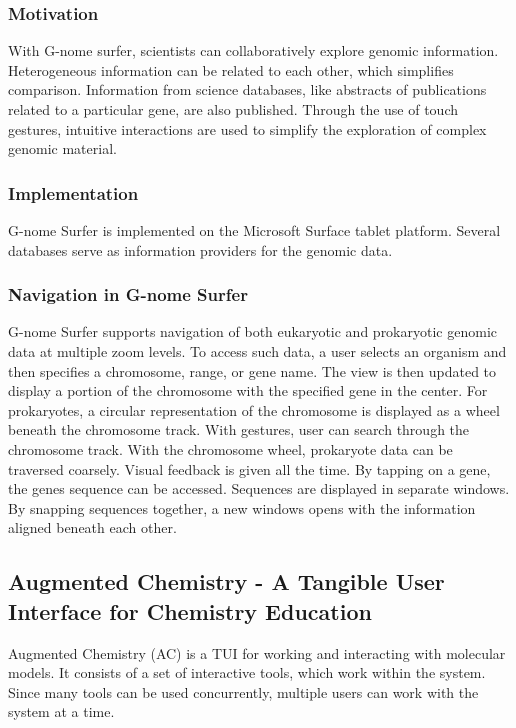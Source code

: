 \subsubsection{Motivation}
With G-nome surfer, scientists can collaboratively explore genomic information. Heterogeneous information can be related to each other, which simplifies comparison. Information from science databases, like abstracts of publications related to a particular gene, are also published. Through the use of touch gestures, intuitive interactions are used to simplify the exploration of complex genomic material. 

\subsubsection{Implementation}
G-nome Surfer is implemented on the Microsoft Surface tablet platform. Several databases serve as information providers for the genomic data. 

\subsubsection{Navigation in G-nome Surfer}
G-nome Surfer supports navigation of both eukaryotic and prokaryotic genomic data at multiple zoom levels. To access such data, a user selects an organism and then specifies a chromosome, range, or gene name. The view is then updated to display a portion of the chromosome with the specified gene in the center. For prokaryotes, a circular representation of the chromosome is displayed as a wheel beneath the chromosome track. With gestures, user can search through the chromosome track. With the chromosome wheel, prokaryote data can be traversed coarsely. Visual feedback is given all the time. By tapping on a gene, the genes sequence can be accessed. Sequences are displayed in separate windows. By snapping sequences together, a new windows opens with the information aligned beneath each other. 

\subsection{Augmented Chemistry - A Tangible User Interface for Chemistry Education}
Augmented Chemistry (AC) is a TUI for working and interacting with molecular models. It consists of a set of interactive tools, which work within the system. Since many tools can be used concurrently, multiple users can work with the system at a time. 

